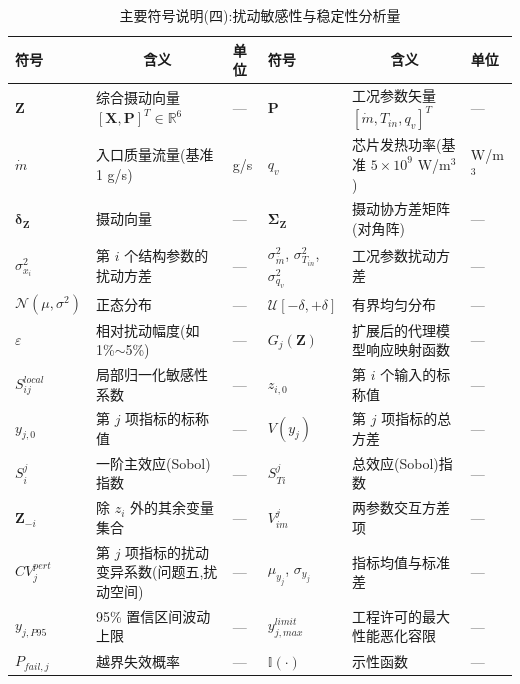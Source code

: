 \begin{table}[H]
\centering
\small
\setlength{\tabcolsep}{2.5pt}
\caption{主要符号说明(四):扰动敏感性与稳定性分析量}
\begin{tabular}{>{\centering\arraybackslash}p{1.55cm}p{4.45cm}>{\centering\arraybackslash}p{1.35cm}>{\centering\arraybackslash}p{1.55cm}p{4.45cm}>{\centering\arraybackslash}p{1.35cm}}
\toprule
符号 & \multicolumn{1}{c}{含义} & 单位 & 符号 & \multicolumn{1}{c}{含义} & 单位 \\
\midrule
$\mathbf{Z}$    & 综合摄动向量 $[\mathbf{X}, \mathbf{P}]^T \in \mathbb{R}^6$ & — & $\mathbf{P}$ & 工况参数矢量 $[\dot{m}, T_{in}, q_v]^T$ & — \\
$\dot{m}$       & 入口质量流量(基准 1 g/s) & g/s & $q_v$        & 芯片发热功率(基准 $5\times10^9$ W/m$^3$) & W/m$^3$ \\
$\boldsymbol{\delta}_{\mathbf{Z}}$ & 摄动向量 & — & $\boldsymbol{\Sigma}_{\mathbf{Z}}$ & 摄动协方差矩阵(对角阵) & — \\
$\sigma_{x_i}^2$  & 第 $i$ 个结构参数的扰动方差 & — & $\sigma_{\dot{m}}^2$, $\sigma_{T_{in}}^2$, $\sigma_{q_v}^2$ & 工况参数扰动方差 & — \\
$\mathcal{N}(\mu, \sigma^2)$ & 正态分布 & — & $\mathcal{U}[-\delta, +\delta]$ & 有界均匀分布 & — \\
$\varepsilon$   & 相对扰动幅度(如 1\%$\sim$5\%) & — & $G_j(\mathbf{Z})$ & 扩展后的代理模型响应映射函数 & — \\
$S_{ij}^{local}$ & 局部归一化敏感性系数 & — & $z_{i,0}$     & 第 $i$ 个输入的标称值 & — \\
$y_{j,0}$       & 第 $j$ 项指标的标称值 & — & $V(y_j)$      & 第 $j$ 项指标的总方差 & — \\
$S_i^j$         & 一阶主效应(Sobol)指数 & — & $S_{Ti}^j$    & 总效应(Sobol)指数 & — \\
$\mathbf{Z}_{-i}$ & 除 $z_i$ 外的其余变量集合 & — & $V_{im}^j$    & 两参数交互方差项 & — \\
$CV_j^{pert}$  & 第 $j$ 项指标的扰动变异系数(问题五,扰动空间) & — & $\mu_{y_j}$, $\sigma_{y_j}$ & 指标均值与标准差 & — \\
$y_{j, P95}$    & 95\% 置信区间波动上限 & — & $y_{j, max}^{limit}$ & 工程许可的最大性能恶化容限 & — \\
$P_{fail, j}$   & 越界失效概率 & — & $\mathbb{I}(\cdot)$ & 示性函数 & — \\
\bottomrule
\end{tabular}
\end{table}

